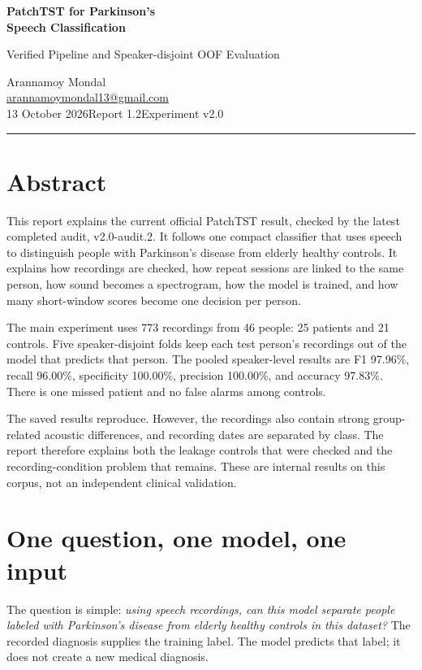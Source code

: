 \documentclass[11pt,a4paper]{article}
\begin{document}
\begin{center}
{\LARGE\bfseries PatchTST for Parkinson's\\[3pt] Speech Classification\par}
\vspace{8pt}
{\large Verified Pipeline and Speaker-disjoint OOF Evaluation\par}
\vspace{10pt}
Arannamoy Mondal\\
\href{mailto:arannamoymondal13@gmail.com}{arannamoymondal13@gmail.com}\\[5pt]
13 October 2026\quad\textbullet\quad Report 1.2\quad\textbullet\quad Experiment v2.0
\end{center}
\vspace{3pt}\hrule\vspace{8pt}

\section*{Abstract}
This report explains the current official PatchTST result, checked by the latest
completed audit, v2.0-audit.2. It follows one compact classifier
that uses speech to distinguish people with Parkinson's disease from elderly
healthy controls. It explains how recordings are checked, how repeat sessions
are linked to the same person, how sound becomes a spectrogram, how the model is
trained, and how many short-window scores become one decision per person.

The main experiment uses 773 recordings from 46 people: 25 patients and 21
controls. Five speaker-disjoint folds keep each test person's recordings out of
the model that predicts that person. The pooled speaker-level results are F1
97.96\%, recall 96.00\%, specificity 100.00\%, precision 100.00\%, and accuracy
97.83\%. There is one missed patient and no false alarms among controls.

The saved results reproduce. However, the recordings also contain strong
group-related acoustic differences, and recording dates are separated by class.
The report therefore explains both the leakage controls that were checked and
the recording-condition problem that remains. These are internal results on
this corpus, not an independent clinical validation.

\section{One question, one model, one input}
The question is simple: \emph{using speech recordings, can this model separate
people labeled with Parkinson's disease from elderly healthy controls in this
dataset?} The recorded diagnosis supplies the training label. The model predicts
that label; it does not create a new medical diagnosis.
\end{document}
